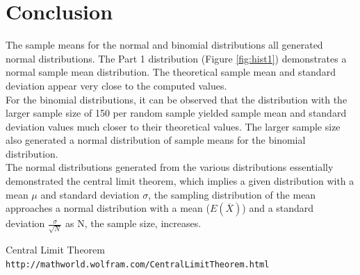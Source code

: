 \documentclass[paper=letter, fontsize=11pt]{article}
\begin{document}
    \section{Conclusion}
    The sample means for the normal and binomial distributions all generated normal distributions. The Part 1 distribution (Figure \ref{fig:hist1}) demonstrates a normal sample mean distribution. The theoretical sample mean and standard deviation appear very close to the computed values.\\


    For the binomial distributions, it can be observed that the distribution with the larger sample size of 150 per random sample yielded sample mean and standard deviation values much closer to their theoretical values. The larger sample size also generated a normal distribution of sample means for the binomial distribution.\\



    The normal distributions generated from the various distributions essentially demonstrated the central limit theorem, which implies a given distribution with a mean $\mu$ and standard deviation $\sigma$, the sampling distribution of the mean approaches a normal distribution with a mean ($E(\overline{X})$) and a standard deviation $\frac{\sigma}{\sqrt{N}}$ as N, the sample size, increases. \cite{wolfram}

    \begin{thebibliography}{9}

        Central Limit Theorem
        \\\texttt{http://mathworld.wolfram.com/CentralLimitTheorem.html}

    \end{thebibliography}

    \clearpage
    \newpage
\end{document}
